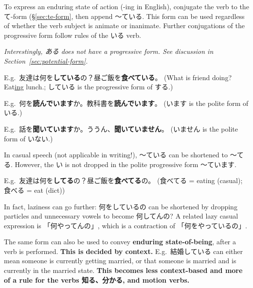 \documentclass[../nihongo-gakushuu-kyouzai.tex]{subfiles}
\begin{document}
To express an enduring state of action (-ing in English), conjugate the verb to the て-form (\S\ref{sec:te-form}, then append 〜ている. This form can be used regardless of whether the verb subject is animate or inanimate. Further conjugations of the progressive form follow rules of the いる verb.

\emph{Interestingly, ある does not have a progressive form. See discussion in Section~\ref{sec:potential-form}.}

E.g.\ 友達は何を\textbf{している}の？昼ご飯を\textbf{食べている}。 (What is friend doing? Eat\ul{ing} lunch.; している is the progressive form of する.)

E.g.\ 何を\textbf{読んでいます}か。教科書を\textbf{読んでいます}。 (います is the polite form of いる.)

E.g.\ 話を\textbf{聞いています}か。ううん、\textbf{聞いていません}。 (いません is the polite form of いない.)

In casual speech (not applicable in writing!), 〜ている can be shortened to 〜てる. However, the い is not dropped in the polite progressive form 〜ています. 

E.g.\ 友達は何を\textbf{してる}の？昼ご飯を\textbf{食べてる}の。 (食べてる = eating (casual); 食べる = eat (dict))

In fact, laziness can go further: 何をしているの can be shortened by dropping particles and unnecessary vowels to become 何してんの? A related lazy casual expression is 「何やってんの」, which is a contraction of 「何をやっているの」.

The same form can also be used to convey \textbf{enduring state-of-being}, after a verb is performed. \textbf{This is decided by context.} E.g.\ 結婚している can either mean someone is currently getting married, or that someone is married and is currently in the married state. \textbf{This becomes less context-based and more of a rule for the verbs 知る、分かる, and motion verbs.}
\end{document}
